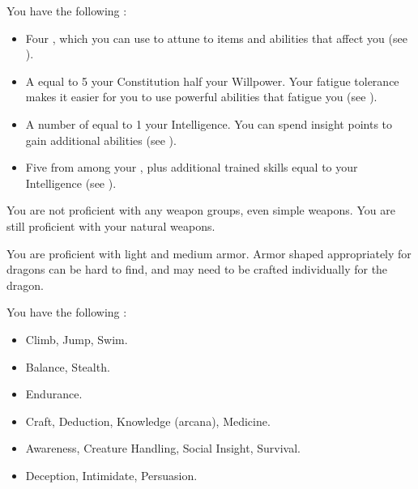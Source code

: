              You have the following :
            \begin{itemize}
                \item Four , which you can use to attune to items and abilities that affect you (see ).
                \item A  equal to 5 \add your Constitution \add half your Willpower.
                    Your fatigue tolerance makes it easier for you to use powerful abilities that fatigue you (see ).
                \item A number of  equal to 1 \add your Intelligence.
                    You can spend insight points to gain additional abilities (see ).
                \item Five  from among your , plus additional trained skills equal to your Intelligence (see ).
            \end{itemize}

            You are not proficient with any weapon groups, even simple weapons.
            You are still proficient with your natural weapons.

            You are proficient with light and medium armor.
            Armor shaped appropriately for dragons can be hard to find, and may need to be crafted individually for the dragon.

            You have the following :
            \begin{itemize}
                \item {} Climb, Jump, Swim.
                \item {} Balance, Stealth.
                \item {} Endurance.
                \item {} Craft, Deduction, Knowledge (arcana), Medicine.
                \item {} Awareness, Creature Handling, Social Insight, Survival.
                \item {} Deception, Intimidate, Persuasion.
            \end{itemize}


